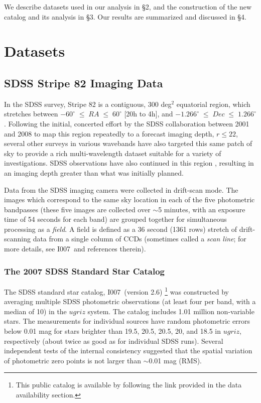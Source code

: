\documentclass[fleqn,usenatbib]{mnras}
\newcommand{\pO}{\hbox{I007}}
\begin{document}
We describe datasets used in our analysis in \S2, and the construction of the new catalog and its analysis in \S3. 
Our results are summarized and discussed in \S4. 


\section{Datasets} \label{sec:data}

\subsection{SDSS Stripe 82 Imaging Data} \label{ssec:s82}

In the SDSS survey, Stripe 82 is a contiguous, 300 deg$^2$ equatorial region, which stretches between $-60^{\circ}\;\leq\;RA\;\leq\;60^{\circ}$ [20h to 4h], and $-1.266^{\circ}\;\leq\;Dec\;\leq\;1.266^{\circ}$. Following the initial, concerted effort by the SDSS collaboration between 2001 and 2008 to map this region repeatedly to a forecast imaging depth, $r \leq 22$, several other surveys in various wavebands have also targeted this same patch of sky to provide a rich multi-wavelength dataset suitable for a variety of investigations. SDSS observations have also continued in this region \citep[e.g., the SDSS-II search for supernovae,][]{2008AJ....135..338F}, resulting in an imaging depth greater than what was initially planned.  

Data from the SDSS imaging camera \citep{1998AJ....116.3040G} were collected in drift-scan mode. The images which correspond to the same sky location in each of the five photometric bandpasses (these five images are collected over $\sim$5 minutes, with an exposure time of 54 seconds for each band) are grouped together for simultaneous processing as a {\it field}. A field is defined as a 36 second (1361 rows) stretch of drift-scanning data from a single column of CCDs (sometimes called a {\it scan line}; for more details, see \pO\ and references therein). 

\subsubsection{The 2007 SDSS Standard Star Catalog}

The SDSS standard star catalog, \pO\ (version 2.6) \footnote{This public catalog is available by following the link provided in the data availability section.} was constructed by averaging multiple SDSS photometric observations (at least four per band, with a median of 10) in the $ugriz$ system. The catalog includes 1.01 million non-variable stars. The measurements for individual sources have random photometric errors below 0.01 mag for stars brighter than 19.5, 20.5, 20.5, 20, and 18.5 in $ugriz$, respectively (about twice as good as for individual SDSS runs). Several independent tests of the internal consistency suggested that the spatial variation of photometric zero points is not larger than $\sim$0.01 mag (RMS).  
\end{document}
